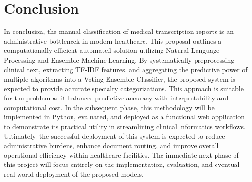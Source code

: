 \chapter{Conclusion}
In conclusion, the manual classification of medical transcription reports is an administrative bottleneck in modern healthcare. This proposal outlines a computationally efficient automated solution utilizing Natural Language Processing and Ensemble Machine Learning. By systematically preprocessing clinical text, extracting TF-IDF features, and aggregating the predictive power of multiple algorithms into a Voting Ensemble Classifier, the proposed system is expected to provide accurate specialty categorizations. This approach is suitable for the problem as it balances predictive accuracy with interpretability and computational cost. In the subsequent phase, this methodology will be implemented in Python, evaluated, and deployed as a functional web application to demonstrate its practical utility in streamlining clinical informatics workflows. Ultimately, the successful deployment of this system is expected to reduce administrative burdens, enhance document routing, and improve overall operational efficiency within healthcare facilities. The immediate next phase of this project will focus entirely on the implementation, evaluation, and eventual real-world deployment of the proposed models.
